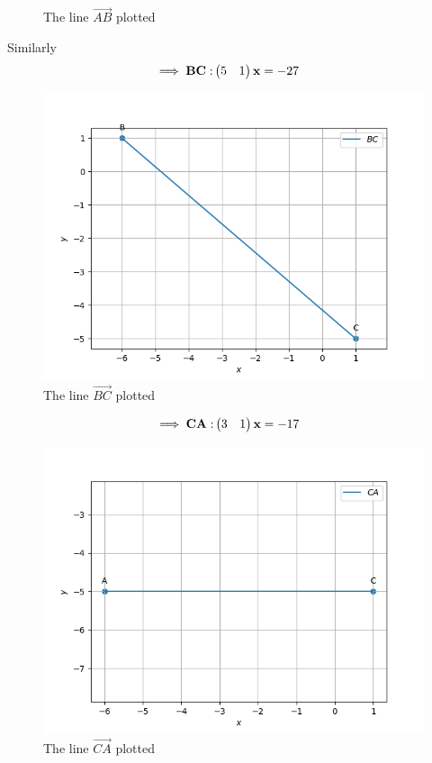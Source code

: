 \documentclass[11pt]{book}
\begin{document}
\begin{enumerate}[label=\thesection.\arabic*.,ref=\thesection.\theenumi]
\begin{figure}[H]
\caption{ The line $\vec{AB}$ plotted}
\label{fig:line AB}
\end{figure}
Similarly
\begin{align}
	\implies
	\mathbf{BC:} \begin{pmatrix}5 & 1\end{pmatrix}\mathbf{x} &= -27
\end{align}
\begin{figure}[H]
\includegraphics [width=\columnwidth] {figs/BC.png}
\caption{ The line $\vec{BC}$ plotted}
\label{fig:line BC}
\end{figure}
\begin{align}
	\implies \mathbf{CA:} \begin{pmatrix}3 & 1\end{pmatrix}\mathbf{x} &= -17
\end{align}
\begin{figure}[H]
\includegraphics [width=\columnwidth] {figs/CA.png}
\caption{ The line $\vec{CA}$ plotted}
\label{fig:line CA}
\end{figure}


\end{enumerate}
\end{document}
